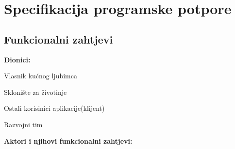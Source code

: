 \chapter{Specifikacija programske potpore}
		
	\section{Funkcionalni zahtjevi}
			
			
			\noindent \textbf{Dionici:}
			
			\begin{packed_enum}
				
				\item Vlasnik kućnog ljubimca
				\item Sklonište za životinje			
				\item Ostali korisinici aplikacije(klijent)
                \item Razvojni tim
				
			\end{packed_enum}
			
			\noindent \textbf{Aktori i njihovi funkcionalni zahtjevi:}
			
